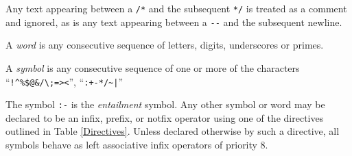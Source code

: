 Any text appearing between a \verb"/*" and the  subsequent
\verb"*/" is treated as a comment and ignored, as is any text
appearing between a \verb"--" and the subsequent newline.


A \emph{word} is any consecutive sequence of letters, digits, underscores or primes.

A \emph{symbol} is any consecutive sequence of one or more of the  characters
``\verb.!^%$@&/\;=><.'',  ``\verb.:+-*/~|.''  

The symbol \verb":-" is the \emph{entailment} symbol. 
Any other symbol or word may be declared to be an infix, prefix, or notfix operator using
one of the directives outlined in Table \ref{Directives}. Unless declared otherwise by such a 
directive, all symbols behave as left associative infix operators of priority 8.

